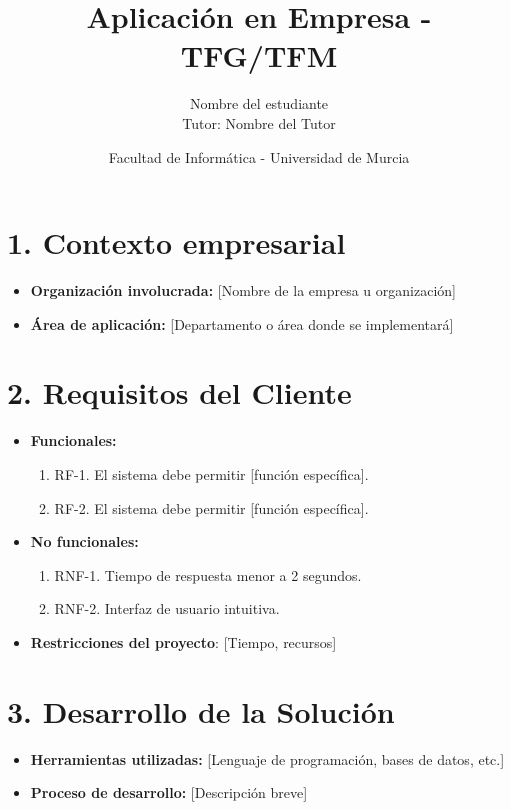 \documentclass[12pt, a4paper]{article}
\title{\textbf{Aplicación en Empresa - TFG/TFM}}
\author{Nombre del estudiante \\ Tutor: Nombre del Tutor}
\date{Facultad de Informática - Universidad de Murcia}
\begin{document}
\maketitle

\section*{1. Contexto empresarial}
\begin{itemize}
    \item \textbf{Organización involucrada:} [Nombre de la empresa u organización]
    \item \textbf{Área de aplicación:} [Departamento o área donde se implementará]
\end{itemize}
\section*{2. Requisitos del Cliente}
\begin{itemize}
    \item \textbf{Funcionales:}
    \begin{enumerate}
        \item RF-1. El sistema debe permitir [función específica].
        \item RF-2. El sistema debe permitir [función específica].
    \end{enumerate}

    \item \textbf{No funcionales:}
    \begin{enumerate}
        \item RNF-1. Tiempo de respuesta menor a 2 segundos.
        \item RNF-2. Interfaz de usuario intuitiva.
    \end{enumerate}
\end{itemize}

\begin{itemize}
    \item \textbf{Restricciones del proyecto}: [Tiempo, recursos]
\end{itemize}
\section*{3. Desarrollo de la Solución}
\begin{itemize}
    \item \textbf{Herramientas utilizadas:} [Lenguaje de programación, bases de datos, etc.]
    \item \textbf{Proceso de desarrollo:} [Descripción breve]
\end{itemize}
\end{document}

